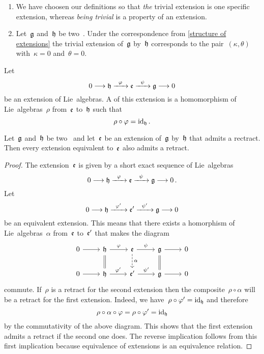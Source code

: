\begin{remark}
	\leavevmode
	\begin{enumerate}
		\item
			We have choosen our definitions so that \emph{the} trivial extension is one specific extension, whereas \emph{being trivial} is a property of an extension.
		\item
			Let~$\mathfrak{g}$ and~$\mathfrak{h}$ be two~\liealgebras{$\kf$}.
			Under the correspondence from \cref{structure of extensions} the trivial extension of~$\mathfrak{g}$ by~$\mathfrak{h}$ corresponds to the pair~$(\kappa, \theta)$ with~$\kappa = 0$ and~$\theta = 0$.
	\end{enumerate}
\end{remark}


\begin{definition}
	Let
	\[
		0
		\to
		\hlie
		\xto{\varphi}
		\elie
		\xto{\psi}
		\glie
		\to
		0
	\]
	be an extension of Lie~algebras.
	A  of this extension is a homomorphism of Lie~algebras~$\rho$ from~$\mathfrak{e}$ to~$\mathfrak{h}$ such that
	\[
		\rho \circ \varphi
		=
		\mathrm{id}_{\mathfrak{h}} \,.
	\]
\end{definition}


\begin{lemma}
	\label{having a retract is invariant under equivalence of extensions}
	Let~$\mathfrak{g}$ and~$\mathfrak{h}$ be two~\liealgebras{$\kf$} and let~$\mathfrak{e}$ be an extension of~$\mathfrak{g}$ by~$\mathfrak{h}$ that admits a rectract.
	Then every extension equivalent to~$\mathfrak{e}$ also admits a retract.
\end{lemma}


\begin{proof}
	The extension~$\mathfrak{e}$ is given by a short exact sequence of Lie~algebras
	\[
		0
		\to
		\hlie
		\xto{\varphi}
		\elie
		\xto{\psi}
		\glie
		\to
		0 \,.
	\]
	Let
	\[
		0
		\to
		\hlie
		\xto{\varphi'}
		\elie'
		\xto{\psi'}
		\glie
		\to
		0
	\]
	be an equivalent extension.
	This means that there exists a homorphism of Lie~algebras~$\alpha$ from~$\mathfrak{e}$ to~$\mathfrak{e}'$ that makes the diagram
	\[
		\begin{tikzcd}
			0
			\arrow{r}
			&
			\hlie
			\arrow{r}[above]{\varphi}
			\arrow[equal]{d}
			&
			\elie
			\arrow{r}[above]{\psi}
			\arrow[dashed]{d}[right]{\alpha}
			&
			\glie
			\arrow{r}
			\arrow[equal]{d}
			&
			0
			\\
			0
			\arrow{r}
			&
			\hlie
			\arrow{r}[above]{\varphi'}
			&
			\elie'
			\arrow{r}[above]{\psi'}
			&
			\glie
			\arrow{r}
			&
			0
		\end{tikzcd}
	\]
	commute.
	If~$\rho$ is a retract for the second extension then the composite~$\rho \circ \alpha$ will be a retract for the first extension.
	Indeed, we have~$\rho \circ \varphi' = \mathrm{id}_{\mathfrak{h}}$ and therefore
	\[
		\rho \circ \alpha \circ \varphi
		=
		\rho \circ \varphi'
		=
		\mathrm{id}_{\mathfrak{h}}
	\]
	by the commutativity of the above diagram.
	This shows that the first extension admits a retract if the second one does.
	The reverse implication follows from this first implication because equivalence of extensions is an equivalence relation.
\end{proof}


